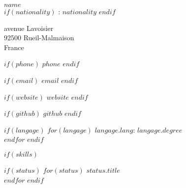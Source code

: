 \documentclass[$fontsize$, letterpaper]{article}
\begin{document}
\begin{multicols}{2}


{\LARGE \textbf{$name$}}\\


$if(nationality)$
: $nationality$
$endif$

\vspace*{.1cm}

\faHome {} avenue Lavoisier \\ \hspace*{.6cm} 92500 Rueil-Malmaison \\ \hspace*{.6cm} France

$if(phone)$
\faPhone \quad $phone$
$endif$

$if(email)$
\faEnvelope \quad \href{mailto:$email$}{$email$}
$endif$

$if(website)$
\faGlobe \quad \href{http://$website$}{$website$}
$endif$

$if(github)$
\faGithub \quad \href{https://github.com/$github$}{$github$}
$endif$


\vspace{.2cm}


$if(langage)$
$for(langage)$
\textbf{$langage.lang$}: $langage.degree$ \\
$endfor$
$endif$


$if(skills)$

\columnbreak


$if(status)$
$for(status)$
{\large\textbf{$status.title$}} \\
$endfor$
$endif$

%



\vspace{-.4cm}


\end{multicols}
\end{document}
